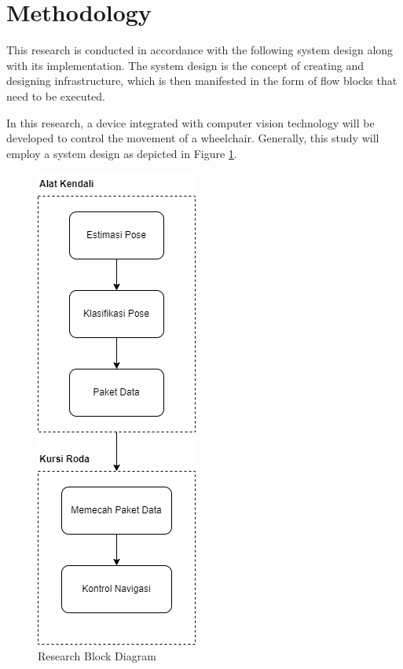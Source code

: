 \section{Methodology}
\label{sec:metodologi}



This research is conducted in accordance with the following system design along with its implementation. The system design is the concept of creating and designing infrastructure, which is then manifested in the form of flow blocks that need to be executed.

In this research, a device integrated with computer vision technology will be developed to control the movement of a wheelchair. Generally, this study will employ a system design as depicted in Figure \ref{fig:Metodologi Penelitian}.

\begin{figure} [ht] \centering
    \includegraphics[scale=0.68]{gambar/blokDiagram.png}
    \caption{Research Block Diagram}
    \label{fig:Metodologi Penelitian}
\end{figure}

